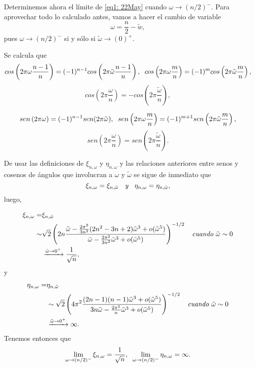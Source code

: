 Determinemos ahora el límite de
\eqref{eq1: 22May} cuando $\omega \rightarrow (n/2)^{-}$.
Para aprovechar todo lo calculado antes, vamos a hacer
el cambio de variable 
\[
\omega = \frac{n}{2} - \tilde{w},
\]
pues $\omega \rightarrow (n/2)^{-}$ si y sólo si
$\tilde{\omega} \rightarrow (0)^{+}$.


Se calcula que 
\[
cos\left(
2 \pi \omega\frac{n-1}{n}
\right) = (-1)^{n-1} cos\left(
2 \pi \tilde{\omega}\frac{n-1}{n}
\right), \hspace{0.2cm}
cos\left(
2 \pi \omega\frac{m}{n}
\right) = (-1)^{m} cos\left(
2 \pi \tilde{\omega}\frac{m}{n}
\right), 
\]
\[
cos\left(
2 \pi \frac{\omega}{n}
\right) = -cos\left(
2 \pi \frac{\tilde{\omega}}{n}
\right), 
\]


\[
sen \left( 2 \pi \omega \right)
= (-1)^{n-1} sen (2 \pi \tilde{\omega})
, \hspace{0.2cm}
sen\left(
2 \pi \omega\frac{m}{n}
\right) = (-1)^{m+1} sen\left(
2 \pi \tilde{\omega}\frac{m}{n}
\right), 
\]
\[
sen\left(
2 \pi \frac{\omega}{n}
\right) = sen\left(
2 \pi \frac{\tilde{\omega}}{n}
\right).
\]

De usar las definiciones
de $\xi_{n, \omega}$ y $\eta_{n, \omega}$
y las relaciones anteriores entre senos y cosenos
de ángulos que involucran a $\omega$ y $\tilde{\omega}$
se sigue de inmediato que
\[
\xi_{n, \omega} = \xi_{n, \tilde{\omega}}
\hspace{0.2cm} \textit{ y } \hspace{0.2cm}
\eta_{n, \omega} = \eta_{n, \tilde{\omega}},
\]
luego, 

\begin{align*}
\xi_{n, \omega} = &
\xi_{n, \tilde{\omega}} \\
\sim &
\sqrt{2} 
\left(
2n
\frac{                                                                                                                                          
\tilde{\omega} - \frac{2\pi^{2}}{3n^{2}}(2n^2-3n+2)\tilde{\omega}^{3} 
+ o(\tilde{\omega}^{5})
}{
\tilde{\omega} -
\frac{2 \pi^{2}}{3 n^{2}} \tilde{\omega}^{3} + o(\tilde{\omega}^{5})
}
\right)^{-1/2}
\hspace{0.2cm} \textit{ cuando } \tilde{\omega} \sim 0
\\ &
\xrightarrow{\tilde{\omega} \rightarrow 0^{+}} 
\frac{1}{\sqrt{n}},
\end{align*}
y 
\begin{align*}
\eta_{n, \omega} = &
\eta_{n, \tilde{\omega}} \\
& \sim 
\sqrt{2} 
\left(
4\pi^{2}
\frac{
(2n-1)(n-1)\tilde{\omega}^{3} + o(\tilde{\omega}^{5})
}{
3 n \tilde{\omega} -
\frac{2 \pi^{2}}{n} \tilde{\omega}^{3} + o(\tilde{\omega}^{5})
}
\right)^{-1/2}  
\hspace{0.2cm} \textit{ cuando } \tilde{\omega} \sim 0
\\  &
\xrightarrow{\tilde{\omega} \rightarrow 0^{+}} 
\infty.
\end{align*}
Tenemos entonces que
\[
\lim\limits_{\omega \rightarrow (n/2)^{-}}{
\xi_{n, \omega}} = \frac{1}{\sqrt{n}},
\hspace{0.2cm}
\lim\limits_{\omega \rightarrow (n/2)^{-}}{
\eta_{n, \omega}} = \infty.
\]

